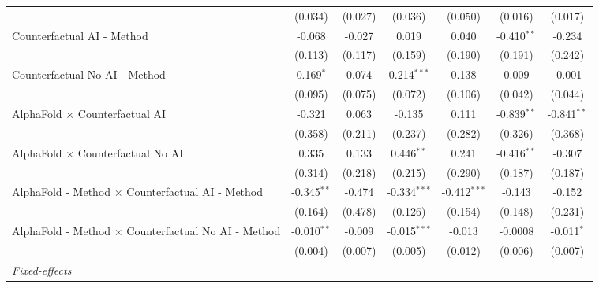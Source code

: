 \begin{tabular}{lcccccc}
                                                              & (0.034)       & (0.027)      & (0.036)        & (0.050)        & (0.016)       & (0.017)\\   
   Counterfactual AI - Method                                 & -0.068        & -0.027       & 0.019          & 0.040          & -0.410$^{**}$ & -0.234\\   
                                                              & (0.113)       & (0.117)      & (0.159)        & (0.190)        & (0.191)       & (0.242)\\   
   Counterfactual No AI - Method                              & 0.169$^{*}$   & 0.074        & 0.214$^{***}$  & 0.138          & 0.009         & -0.001\\   
                                                              & (0.095)       & (0.075)      & (0.072)        & (0.106)        & (0.042)       & (0.044)\\   
   AlphaFold $\times$ Counterfactual AI                       & -0.321        & 0.063        & -0.135         & 0.111          & -0.839$^{**}$ & -0.841$^{**}$\\   
                                                              & (0.358)       & (0.211)      & (0.237)        & (0.282)        & (0.326)       & (0.368)\\   
   AlphaFold $\times$ Counterfactual No AI                    & 0.335         & 0.133        & 0.446$^{**}$   & 0.241          & -0.416$^{**}$ & -0.307\\   
                                                              & (0.314)       & (0.218)      & (0.215)        & (0.290)        & (0.187)       & (0.187)\\   
   AlphaFold - Method $\times$ Counterfactual AI - Method     & -0.345$^{**}$ & -0.474       & -0.334$^{***}$ & -0.412$^{***}$ & -0.143        & -0.152\\   
                                                              & (0.164)       & (0.478)      & (0.126)        & (0.154)        & (0.148)       & (0.231)\\   
   AlphaFold - Method $\times$ Counterfactual No AI - Method  & -0.010$^{**}$ & -0.009       & -0.015$^{***}$ & -0.013         & -0.0008       & -0.011$^{*}$\\   
                                                              & (0.004)       & (0.007)      & (0.005)        & (0.012)        & (0.006)       & (0.007)\\   
   \midrule
   \emph{Fixed-effects}\\

\end{tabular}
